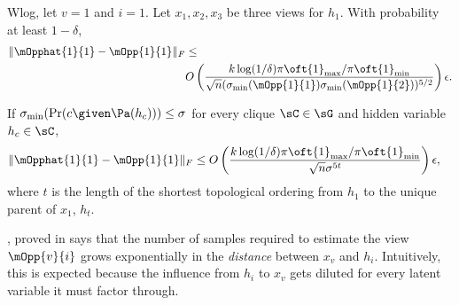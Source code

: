 \begin{theorem}
  \label{thm:sample-complexity}
  Wlog, let $v=1$ and $i=1$. Let $x_1, x_2, x_3$ be three views for
  $h_1$. With probability at least $1 - \delta$,
\begin{align*}
  \|\mOpphat{1}{1} - \mOpp{1}{1}\|_F 
    &\le  \\
    &
      O\left(
      \frac{k \log(1/\delta) {\pi\oft{1}}_{\max}/{\pi\oft{1}}_{\min} } 
      {\sqrt{n}(\sigma_{\min}(\mOpp{1}{1}) \sigma_{\min}(\mOpp{1}{2}))^{5/2}} \right) \epsilon.
\end{align*}

If $\sigma_{\min}(\Pr(c \given \Pa(h_c))) \le \sigma$ for every clique
  $\sC \in \sG$ and hidden variable $h_c \in \sC$,
\begin{align*}
  \|\mOpphat{1}{1} - \mOpp{1}{1}\|_F 
    &\le 
      O\left( 
      \frac{k \log(1/\delta) {\pi\oft{1}}_{\max}/{\pi\oft{1}}_{\min}} 
      {\sqrt{n} \sigma^{5t}} \right) \epsilon,
\end{align*}
where $t$ is the length of the shortest topological ordering from $h_1$
to the unique parent of $x_1$, $h_t$.
\end{theorem}

, proved in 
  says that the number of samples required to estimate the view
  $\mOpp{v}{i}$ grows exponentially in the {\em distance} between $x_v$
  and $h_i$. 
Intuitively, this is expected because the influence from $h_i$ to $x_v$
  gets diluted for every latent variable it must factor through.


